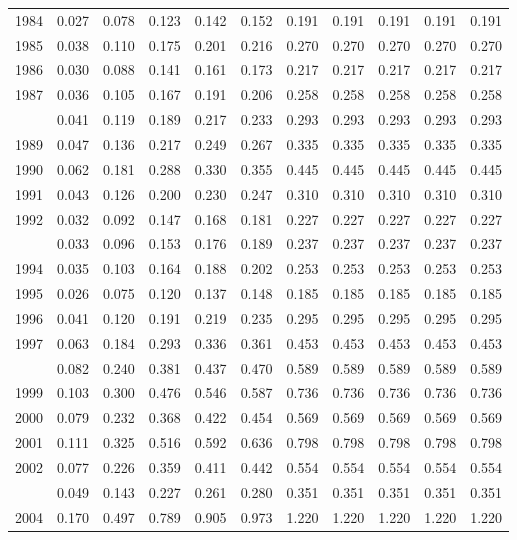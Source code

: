 \documentclass[
]{article}
\begin{document}
\begin{longtable}[t]{lrrrrrrrrrr}
1984 & 0.027 & 0.078 & 0.123 & 0.142 & 0.152 & 0.191 & 0.191 & 0.191 & 0.191 & 0.191\\
1985 & 0.038 & 0.110 & 0.175 & 0.201 & 0.216 & 0.270 & 0.270 & 0.270 & 0.270 & 0.270\\
1986 & 0.030 & 0.088 & 0.141 & 0.161 & 0.173 & 0.217 & 0.217 & 0.217 & 0.217 & 0.217\\
1987 & 0.036 & 0.105 & 0.167 & 0.191 & 0.206 & 0.258 & 0.258 & 0.258 & 0.258 & 0.258\\
\addlinespace
1988 & 0.041 & 0.119 & 0.189 & 0.217 & 0.233 & 0.293 & 0.293 & 0.293 & 0.293 & 0.293\\
1989 & 0.047 & 0.136 & 0.217 & 0.249 & 0.267 & 0.335 & 0.335 & 0.335 & 0.335 & 0.335\\
1990 & 0.062 & 0.181 & 0.288 & 0.330 & 0.355 & 0.445 & 0.445 & 0.445 & 0.445 & 0.445\\
1991 & 0.043 & 0.126 & 0.200 & 0.230 & 0.247 & 0.310 & 0.310 & 0.310 & 0.310 & 0.310\\
1992 & 0.032 & 0.092 & 0.147 & 0.168 & 0.181 & 0.227 & 0.227 & 0.227 & 0.227 & 0.227\\
\addlinespace
1993 & 0.033 & 0.096 & 0.153 & 0.176 & 0.189 & 0.237 & 0.237 & 0.237 & 0.237 & 0.237\\
1994 & 0.035 & 0.103 & 0.164 & 0.188 & 0.202 & 0.253 & 0.253 & 0.253 & 0.253 & 0.253\\
1995 & 0.026 & 0.075 & 0.120 & 0.137 & 0.148 & 0.185 & 0.185 & 0.185 & 0.185 & 0.185\\
1996 & 0.041 & 0.120 & 0.191 & 0.219 & 0.235 & 0.295 & 0.295 & 0.295 & 0.295 & 0.295\\
1997 & 0.063 & 0.184 & 0.293 & 0.336 & 0.361 & 0.453 & 0.453 & 0.453 & 0.453 & 0.453\\
\addlinespace
1998 & 0.082 & 0.240 & 0.381 & 0.437 & 0.470 & 0.589 & 0.589 & 0.589 & 0.589 & 0.589\\
1999 & 0.103 & 0.300 & 0.476 & 0.546 & 0.587 & 0.736 & 0.736 & 0.736 & 0.736 & 0.736\\
2000 & 0.079 & 0.232 & 0.368 & 0.422 & 0.454 & 0.569 & 0.569 & 0.569 & 0.569 & 0.569\\
2001 & 0.111 & 0.325 & 0.516 & 0.592 & 0.636 & 0.798 & 0.798 & 0.798 & 0.798 & 0.798\\
2002 & 0.077 & 0.226 & 0.359 & 0.411 & 0.442 & 0.554 & 0.554 & 0.554 & 0.554 & 0.554\\
\addlinespace
2003 & 0.049 & 0.143 & 0.227 & 0.261 & 0.280 & 0.351 & 0.351 & 0.351 & 0.351 & 0.351\\
2004 & 0.170 & 0.497 & 0.789 & 0.905 & 0.973 & 1.220 & 1.220 & 1.220 & 1.220 & 1.220\\

\end{longtable}
\end{document}
